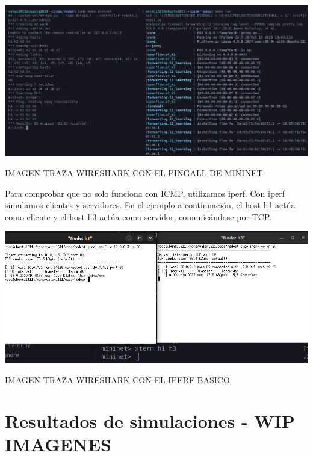 \documentclass{article}
\begin{document}
\begin{center}
    \includegraphics[scale=0.23]{mininet_pingall.png}
\end{center}

IMAGEN TRAZA WIRESHARK CON EL PINGALL DE MININET
\begin{center}
\end{center}

Para comprobar que no solo funciona con ICMP, utilizamos iperf. Con iperf simulamos clientes y servidores. En el ejemplo a continuación, el host h1 actúa como cliente y el host h3 actúa como servidor, comunicándose por TCP.

\begin{center}
\includegraphics[scale=0.37]{mininet_iperf_basico.png}
\end{center}

IMAGEN TRAZA WIRESHARK CON EL IPERF BASICO
\begin{center}
\end{center}

\newpage
\section{Resultados de simulaciones - WIP IMAGENES}\label{pruebas-wip}
\end{document}
